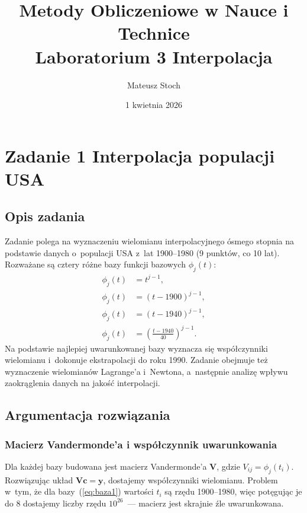 \documentclass[12pt, a4paper]{article}
\title{
  \textbf{Metody Obliczeniowe w Nauce i Technice} \\[0.5em]
  \large Laboratorium 3 \textemdash{} Interpolacja
}
\author{Mateusz Stoch}
\date{1 kwietnia 2026}
\begin{document}
\maketitle

\section{Zadanie 1 \textemdash{} Interpolacja populacji USA}

\subsection{Opis zadania}

Zadanie polega na wyznaczeniu wielomianu interpolacyjnego ósmego stopnia
na podstawie danych o~populacji USA z~lat 1900--1980 (9 punktów, co 10 lat).
Rozważane są cztery różne bazy funkcji bazowych $\phi_j(t)$:
\begin{align}
  \phi_j(t) &= t^{j-1}, \label{eq:baza1} \\
  \phi_j(t) &= (t - 1900)^{j-1}, \label{eq:baza2} \\
  \phi_j(t) &= (t - 1940)^{j-1}, \label{eq:baza3} \\
  \phi_j(t) &= \left(\frac{t - 1940}{40}\right)^{j-1}. \label{eq:baza4}
\end{align}
Na podstawie najlepiej uwarunkowanej bazy wyznacza się współczynniki wielomianu
i~dokonuje ekstrapolacji do roku 1990. Zadanie obejmuje też wyznaczenie
wielomianów Lagrange'a i~Newtona, a~następnie analizę wpływu zaokrąglenia
danych na jakość interpolacji.

\subsection{Argumentacja rozwiązania}

\subsubsection{Macierz Vandermonde'a i współczynnik uwarunkowania}

Dla każdej bazy budowana jest macierz Vandermonde'a $\mathbf{V}$, gdzie
$V_{ij} = \phi_j(t_i)$. Rozwiązując układ $\mathbf{V}\mathbf{c} = \mathbf{y}$,
dostajemy współczynniki wielomianu. Problem w~tym, że dla bazy~(\ref{eq:baza1})
wartości $t_i$ są rzędu 1900--1980, więc potęgując je do 8 dostajemy liczby
rzędu $10^{26}$~--- macierz jest skrajnie źle uwarunkowana.
\end{document}

